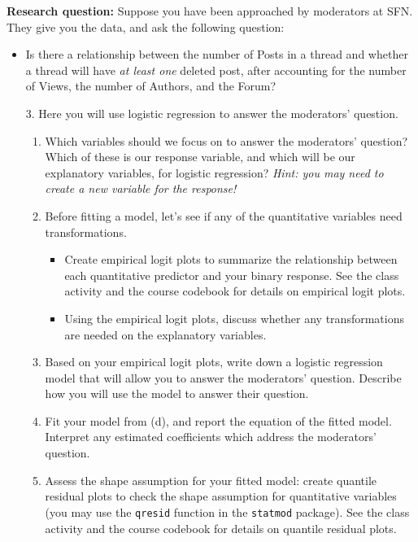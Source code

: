 \documentclass[11pt]{article}
\begin{document}
\noindent \textbf{Research question:} Suppose you have been approached by moderators at SFN. They give you the data, and ask the following question:
\begin{itemize}
\item Is there a relationship between the number of Posts in a thread and whether a thread will have \textit{at least one} deleted post, after accounting for the number of Views, the number of Authors, and the Forum?
\end{itemize}

\begin{enumerate}
\item[3.] Here you will use logistic regression to answer the moderators' question.

\begin{enumerate}
\item Which variables should we focus on to answer the moderators' question? Which of these is our response variable, and which will be our explanatory variables, for logistic regression? \textit{Hint: you may need to create a new variable for the response!}

\item Before fitting a model, let's see if any of the quantitative variables need transformations.
\begin{itemize}
\item Create empirical logit plots to summarize the relationship between each quantitative predictor and your binary response. See the class activity and the course codebook for details on empirical logit plots.
\item Using the empirical logit plots, discuss whether any transformations are needed on the explanatory variables.
\end{itemize}
\item Based on your empirical logit plots, write down a logistic regression model that will allow you to answer the moderators' question. Describe how you will use the model to answer their question.
\item Fit your model from (d), and report the equation of the fitted model. Interpret any estimated coefficients which address the moderators' question.

\item Assess the shape assumption for your fitted model: create quantile residual plots to check the shape assumption for quantitative variables (you may use the \texttt{qresid} function in the \texttt{statmod} package). See the class activity and the course codebook for details on quantile residual plots.


\end{enumerate}
\end{enumerate}
\end{document}
